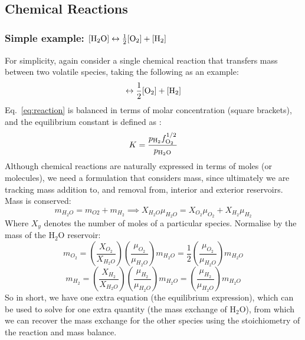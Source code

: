 \subsection{Chemical Reactions}
\label{sect:chemreact}
\subsubsection{Simple example: $[\rm{H}_2O]\leftrightarrow \frac{1}{2} [\rm{O}_2] + [\rm{H}_2]$}
For simplicity, again consider a single chemical reaction that transfers mass between two volatile species, taking the following as an example:
\begin{equation}
    [\rm{H}_2O]\leftrightarrow \frac{1}{2} [\rm{O}_2] + [\rm{H}_2]
    \label{eq:reaction}
\end{equation}
Eq.~\ref{eq:reaction} is balanced in terms of molar concentration (square brackets), and the equilibrium constant is defined as \cite[e.g.][]{SF17}:
\begin{equation}
K=\frac{p_{\rm H_2} f_{\rm O_2}^{1/2}}{p_{\rm H_2\rm O}}
\label{eq:SFequil}
\end{equation}
Although chemical reactions are naturally expressed in terms of moles (or molecules), we need a formulation that considers mass, since ultimately we are tracking mass addition to, and removal from, interior and exterior reservoirs.  Mass is conserved:
\begin{equation}
m_{H_2O} = m_{O2} + m_{H_2} \implies X_{H_2O} \mu_{H_2O} = X_{O_2} \mu_{O_2} + X_{H_2} \mu_{H_2}
\label{eq:reaction_mass}
\end{equation}
Where $X_y$ denotes the number of moles of a particular species.  Normalise by the mass of the H$_2$O reservoir:
\begin{equation}
m_{O_2} = \left( \frac{X_{O_2}}{X_{H_2O}} \right) \left(\frac{\mu_{O_2}}{\mu_{H_2O}}\right) m_{H_2O} = \frac{1}{2} \left(\frac{\mu_{O_2}}{\mu_{H_2O}}\right) m_{H_2O}
\end{equation}
\begin{equation}
m_{H_2} = \left( \frac{X_{H_2}}{X_{H_2O}} \right) \left(\frac{\mu_{H_2}}{\mu_{H_2O}}\right) m_{H_2O} = \left(\frac{\mu_{H_2}}{\mu_{H_2O}}\right) m_{H_2O}
\end{equation}
So in short, we have one extra equation (the equilibrium expression), which can be used to solve for one extra quantity (the mass exchange of H$_2$O), from which we can recover the mass exchange for the other species using the stoichiometry of the reaction and mass balance.
